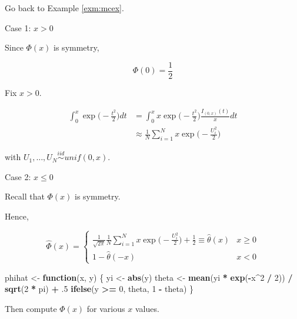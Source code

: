 \documentclass[]{book}
\newenvironment{Shaded}{\begin{snugshade}}{\end{snugshade}}
\newcommand{\ControlFlowTok}[1]{\textcolor[rgb]{0.13,0.29,0.53}{\textbf{#1}}}
\newcommand{\DecValTok}[1]{\textcolor[rgb]{0.00,0.00,0.81}{#1}}
\newcommand{\FloatTok}[1]{\textcolor[rgb]{0.00,0.00,0.81}{#1}}
\newcommand{\KeywordTok}[1]{\textcolor[rgb]{0.13,0.29,0.53}{\textbf{#1}}}
\newcommand{\NormalTok}[1]{#1}
\newcommand{\OperatorTok}[1]{\textcolor[rgb]{0.81,0.36,0.00}{\textbf{#1}}}
\newcommand{\StringTok}[1]{\textcolor[rgb]{0.31,0.60,0.02}{#1}}
\theoremstyle{definition}
\theoremstyle{definition}
\theoremstyle{definition}
\theoremstyle{remark}
\let\BeginKnitrBlock\begin \let\EndKnitrBlock\end
\begin{document}
Go back to Example \ref{exm:mcex}.

\BeginKnitrBlock{solution}
{}Case 1: \(x > 0\)

Since \(\Phi(x)\) is symmetry,

\[\Phi(0) = \frac{1}{2}\]

Fix \(x > 0\).

\begin{equation*}
  \begin{split}
    \int_0^x \exp\bigg(-\frac{t^2}{2}\bigg) dt & = \int_0^x x\exp\bigg(-\frac{t^2}{2}\bigg)\frac{I_{(0, x)}(t)}{x} dt \\
    & \approx \frac{1}{N} \sum_{i = 1}^N x\exp\bigg(-\frac{U_i^2}{2}\bigg)
  \end{split}
\end{equation*}

with \(U_1, \ldots, U_N \stackrel{iid}{\sim}unif(0, x)\).

Case 2: \(x \le 0\)

Recall that \(\Phi(x)\) is symmetry.

Hence,

\[
\hat\Phi(x) = \begin{cases}
  \frac{1}{\sqrt{2\pi}} \frac{1}{N} \sum_{i = 1}^N x\exp\bigg(-\frac{U_i^2}{2}\bigg) + \frac{1}{2} \equiv \hat\theta(x) & x \ge 0 \\
  1 - \hat\theta(-x) & x < 0
\end{cases}
\]
\EndKnitrBlock{solution}

\begin{Shaded}
\begin{Highlighting}[]
\NormalTok{phihat <-}\StringTok{ }\ControlFlowTok{function}\NormalTok{(x, y) \{}
\NormalTok{  yi <-}\StringTok{ }\KeywordTok{abs}\NormalTok{(y)}
\NormalTok{  theta <-}\StringTok{ }\KeywordTok{mean}\NormalTok{(yi }\OperatorTok{*}\StringTok{ }\KeywordTok{exp}\NormalTok{(}\OperatorTok{-}\NormalTok{x}\OperatorTok{^}\DecValTok{2} \OperatorTok{/}\StringTok{ }\DecValTok{2}\NormalTok{)) }\OperatorTok{/}\StringTok{ }\KeywordTok{sqrt}\NormalTok{(}\DecValTok{2} \OperatorTok{*}\StringTok{ }\NormalTok{pi) }\OperatorTok{+}\StringTok{ }\FloatTok{.5}
  \KeywordTok{ifelse}\NormalTok{(y }\OperatorTok{>=}\StringTok{ }\DecValTok{0}\NormalTok{, theta, }\DecValTok{1} \OperatorTok{-}\StringTok{ }\NormalTok{theta)}
\NormalTok{\}}
\end{Highlighting}
\end{Shaded}

Then compute \(\hat\Phi(x)\) for various \(x\) values.
\end{document}
